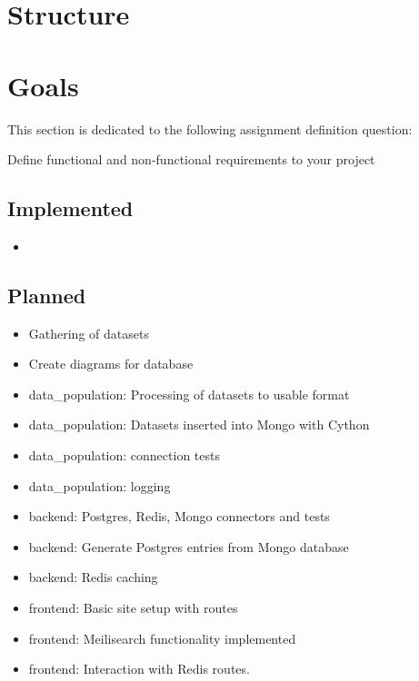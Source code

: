 \documentclass[a4paper, 12pt]{article}
\begin{document}
\section{Structure}


\section{Goals}
This section is dedicated to the following assignment definition question:

Define functional and non-functional requirements to your project

\subsection{Implemented}
\begin{itemize}
	\item
\end{itemize}

\subsection{Planned}
\begin{itemize}
	\item Gathering of datasets
	\item Create diagrams for database
	\item data\_population: Processing of datasets to usable format
	\item data\_population: Datasets inserted into Mongo with Cython
	\item data\_population: connection tests
	\item data\_population: logging
	\item backend: Postgres, Redis, Mongo connectors and tests
	\item backend: Generate Postgres entries from Mongo database
	\item backend: Redis caching
	\item frontend: Basic site setup with routes
	\item frontend: Meilisearch functionality implemented
	\item frontend: Interaction with Redis routes.
\end{itemize}
\end{document}
